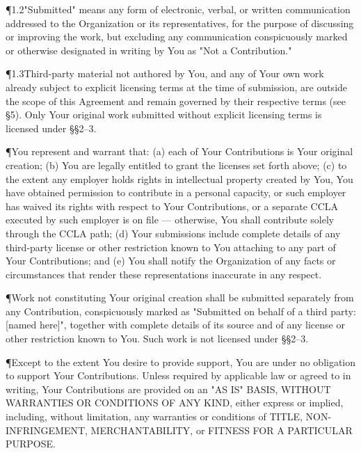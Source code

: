 \P{1.2}{"Submitted" means any form of electronic, verbal, or written communication addressed to the Organization or its representatives, for the purpose of discussing or improving the work, but excluding any communication conspicuously marked or otherwise designated in writing by You as "Not a Contribution."}

\P{1.3}{Third-party material not authored by You, and any of Your own work already subject to explicit licensing terms at the time of submission, are outside the scope of this Agreement and remain governed by their respective terms (see \S5). Only Your original work submitted without explicit licensing terms is licensed under \S\S2--3.}

\clausecopyright

\clausepatent


\P{}{You represent and warrant that: (a) each of Your Contributions is Your original creation; (b) You are legally entitled to grant the licenses set forth above; (c) to the extent any employer holds rights in intellectual property created by You, You have obtained permission to contribute in a personal capacity, or such employer has waived its rights with respect to Your Contributions, or a separate CCLA executed by such employer is on file --- otherwise, You shall contribute solely through the CCLA path; (d) Your submissions include complete details of any third-party license or other restriction known to You attaching to any part of Your Contributions; and (e) You shall notify the Organization of any facts or circumstances that render these representations inaccurate in any respect.}


\P{}{Work not constituting Your original creation shall be submitted separately from any Contribution, conspicuously marked as "Submitted on behalf of a third party: [named here]", together with complete details of its source and of any license or other restriction known to You. Such work is not licensed under \S\S2--3.}


\P{}{Except to the extent You desire to provide support, You are under no obligation to support Your Contributions. Unless required by applicable law or agreed to in writing, Your Contributions are provided on an "AS IS" BASIS, WITHOUT WARRANTIES OR CONDITIONS OF ANY KIND, either express or implied, including, without limitation, any warranties or conditions of TITLE, NON-INFRINGEMENT, MERCHANTABILITY, or FITNESS FOR A PARTICULAR PURPOSE.}

